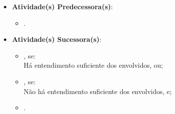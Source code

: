 \begin{itemize}
{\begin{itemize}
						\end{itemize}}
					\item{\textbf{Atividade(s) Predecessora(s)}:
						\begin{itemize}
							\item{.}
						\end{itemize}}
					\item{\textbf{Atividade(s) Sucessora(s)}:
						\begin{itemize}
							\item{, se:
								\\ Há entendimento suficiente dos envolvidos, ou;}
							\item{, se:
								\\ Não há entendimento suficiente dos envolvidos, e;}
							\item{.}
						\end{itemize}}
				\end{itemize}

